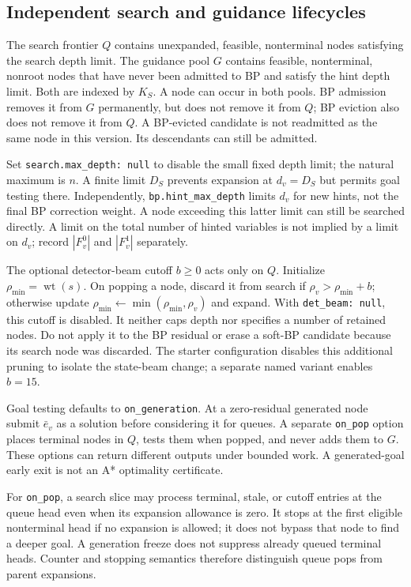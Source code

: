 \documentclass[11pt,a4paper]{article}
\newcommand{\wt}{\operatorname{wt}}
\newcommand{\code}[1]{\nolinkurl{#1}}
\begin{document}
\subsection{Independent search and guidance lifecycles}
The search frontier $Q$ contains unexpanded, feasible, nonterminal nodes satisfying the search depth limit. The guidance pool $G$ contains feasible, nonterminal, nonroot nodes that have never been admitted to BP and satisfy the hint depth limit. Both are indexed by $K_S$. A node can occur in both pools. BP admission removes it from $G$ permanently, but does not remove it from $Q$; BP eviction also does not remove it from $Q$. A BP-evicted candidate is not readmitted as the same node in this version. Its descendants can still be admitted.

Set \code{search.max_depth: null} to disable the small fixed depth limit; the natural maximum is $n$. A finite limit $D_S$ prevents expansion at $d_v=D_S$ but permits goal testing there. Independently, \code{bp.hint_max_depth} limits $d_v$ for new hints, not the final BP correction weight. A node exceeding this latter limit can still be searched directly. A limit on the total number of hinted variables is not implied by a limit on $d_v$; record $|F_v^0|$ and $|F_v^1|$ separately.

The optional detector-beam cutoff $b\geq0$ acts only on $Q$. Initialize $\rho_{\min}=\wt(s)$. On popping a node, discard it from search if $\rho_v>\rho_{\min}+b$; otherwise update $\rho_{\min}\leftarrow\min(\rho_{\min},\rho_v)$ and expand. With \code{det_beam: null}, this cutoff is disabled. It neither caps depth nor specifies a number of retained nodes. Do not apply it to the BP residual or erase a soft-BP candidate because its search node was discarded. The starter configuration disables this additional pruning to isolate the state-beam change; a separate named variant enables $b=15$.

Goal testing defaults to \code{on_generation}. At a zero-residual generated node submit $\bar e_v$ as a solution before considering it for queues. A separate \code{on_pop} option places terminal nodes in $Q$, tests them when popped, and never adds them to $G$. These options can return different outputs under bounded work. A generated-goal early exit is not an A* optimality certificate.

For \code{on_pop}, a search slice may process terminal, stale, or cutoff entries at the queue head even when its expansion allowance is zero. It stops at the first eligible nonterminal head if no expansion is allowed; it does not bypass that node to find a deeper goal. A generation freeze does not suppress already queued terminal heads. Counter and stopping semantics therefore distinguish queue pops from parent expansions.
\end{document}
